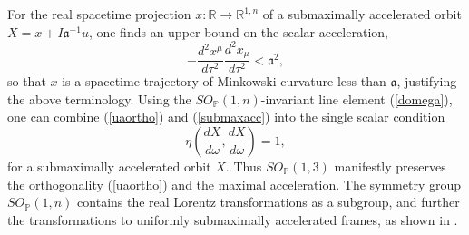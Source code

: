 \documentclass[a4paper,aps,prd,showkeys,showpacs,superscriptaddress,preprint]{revtex4}
\newcommand{\pc}{\mathbb{P}}
\newcommand{\reals}{\mathbb{R}}
\begin{document}
For the real spacetime projection $x: \reals \longrightarrow
\reals^{1,n}$ of a submaximally accelerated orbit $X = x + I \mathfrak{a}^{-1}
u$, one finds an upper bound on the scalar acceleration,
\begin{equation}
  - \frac{d^2x^\mu}{d\tau^2} \frac{d^2x_\mu}{d\tau^2} < \mathfrak{a}^2,
\end{equation} 
so that $x$ is a spacetime trajectory of Minkowski curvature less than
$\mathfrak{a}$, justifying the above terminology.
Using the $SO_\pc(1,n)$-invariant line element (\ref{domega}),
one can combine (\ref{uaortho}) and (\ref{submaxacc}) into the single
scalar condition 
\begin{equation}
  \eta(\frac{dX}{d\omega}, \frac{dX}{d\omega}) = 1,
\end{equation}
for a submaximally accelerated orbit $X$. Thus $SO_\pc(1,3)$ manifestly
preserves the orthogonality (\ref{uaortho}) and the maximal
acceleration. 
The symmetry group $SO_\pc(1,n)$ contains the real Lorentz
transformations as a subgroup, and further the transformations to
uniformly submaximally accelerated frames, as shown in
\cite{Schuller:2002fn}.\\ 

\end{document}
